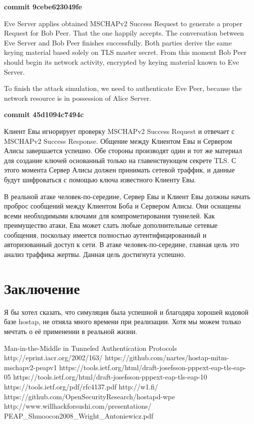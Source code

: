 \documentclass{extarticle}
\begin{document}
\textbf{commit 9cebe623049fe}

Eve Server applies obtained MSCHAPv2 Success Request to generate
a proper Request for Bob Peer. That the one happily accepts.
The conversation between Eve Server and Bob Peer finishes successfully.
Both parties derive the same keying material based solely on TLS master secret.
From this moment Bob Peer should begin
its network activity, encrypted by keying material known to Eve Server.

To finish the attack simulation, we need to authenticate Eve Peer,
because the network resource is in possession of Alice Server.

\textbf{commit 45d1094c7494c}

Клиент Евы игнорирует проверку MSCHAPv2 Success Request
и отвечает с MSCHAPv2 Success Response.
Общение между Клиентом Евы и Сервером Алисы
завершается успешно. Обе стороны производят
один и тот же материал для создание ключей
основанный только на главенствующем секрете TLS.
С этого момента Сервер Алисы должен принимать
сетевой траффик, и данные будут шифроваться с помощью
ключа известного Клиенту Евы.

В реальной атаке человек-по-середине, Сервер Евы
и Клиент Евы должны начать проброс сообщений между Клиентом Боба
и Сервером Алисы.
Они оснащены всеми необходимыми ключами для компрометирования
туннелей.
Как преимущество атаки,
Ева может слать любые дополнительные сетевые сообщения,
поскольку имеется полностью аутентифицированный и авторизованный
доступ к сети.
В атаке человек-по-середине, главная цель это анализ траффика жертвы.
Данная цель достигнута успешно.

\section{Заключение}
Я бы хотел сказать, что симуляция была успешной
и благодяра хорошей кодовой базе hostap,
не отняла много времени при реализации.
Хотя мы можем только мечтать о её применении в реальной жизни.

\begin{thebibliography}{99}
    Man-in-the-Middle in Tunneled Authentication Protocols \\
    http://eprint.iacr.org/2002/163/
    https://github.com/nartes/hostap-mitm-mschapv2-peapv1
    https://tools.ietf.org/html/draft-josefsson-pppext-eap-tls-eap-05
    https://tools.ietf.org/html/draft-josefsson-pppext-eap-tls-eap-10
    https://tools.ietf.org/pdf/rfc4137.pdf
    http://w1.fi/
    https://github.com/OpenSecurityResearch/hostapd-wpe
    http://www.willhackforsushi.com/presentations/\\
    PEAP\_Shmoocon2008\_Wright\_Antoniewicz.pdf
\end{thebibliography}
\end{document}
